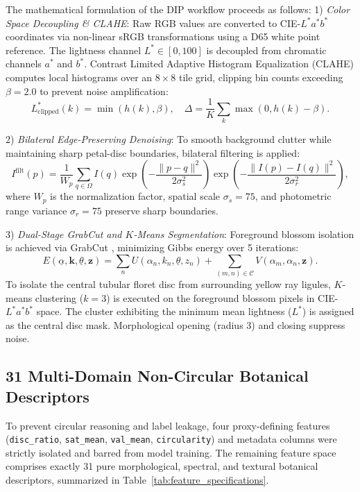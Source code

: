 \documentclass{ieeeaccess}
\begin{document}
The mathematical formulation of the DIP workflow proceeds as follows:
1) \textit{Color Space Decoupling \& CLAHE}: Raw RGB values are converted to CIE-$L^*a^*b^*$ coordinates via non-linear sRGB transformations using a D65 white point reference. The lightness channel $L^* \in [0, 100]$ is decoupled from chromatic channels $a^*$ and $b^*$. Contrast Limited Adaptive Histogram Equalization (CLAHE) \cite{zuiderveld1994contrast} computes local histograms over an $8 \times 8$ tile grid, clipping bin counts exceeding $\beta = 2.0$ to prevent noise amplification:
\begin{equation}
L^*_{\text{clipped}}(k) = \min(h(k), \beta), \quad \Delta = \frac{1}{K}\sum_k \max(0, h(k) - \beta).
\label{eq:clahe}
\end{equation}

2) \textit{Bilateral Edge-Preserving Denoising}: To smooth background clutter while maintaining sharp petal-disc boundaries, bilateral filtering \cite{tomasi1998bilateral} is applied:
\begin{equation}
I^{\text{filt}}(p) = \frac{1}{W_p} \sum_{q \in \Omega} I(q) \exp\left(-\frac{\|p - q\|^2}{2\sigma_s^2}\right) \exp\left(-\frac{\|I(p) - I(q)\|^2}{2\sigma_r^2}\right),
\label{eq:bilateral}
\end{equation}
where $W_p$ is the normalization factor, spatial scale $\sigma_s = 75$, and photometric range variance $\sigma_r = 75$ preserve sharp boundaries.

3) \textit{Dual-Stage GrabCut and $K$-Means Segmentation}: Foreground blossom isolation is achieved via GrabCut \cite{rother2004grabcut}, minimizing Gibbs energy over 5 iterations:
\begin{equation}
E(\underline{\alpha}, \mathbf{k}, \underline{\theta}, \mathbf{z}) = \sum_n U(\alpha_n, k_n, \underline{\theta}, z_n) + \sum_{(m,n) \in \mathcal{C}} V(\alpha_m, \alpha_n, \mathbf{z}).
\label{eq:grabcut}
\end{equation}
To isolate the central tubular floret disc from surrounding yellow ray ligules, $K$-means clustering ($k = 3$) is executed on the foreground blossom pixels in CIE-$L^*a^*b^*$ space. The cluster exhibiting the minimum mean lightness ($L^*$) is assigned as the central disc mask. Morphological opening (radius 3) and closing suppress noise.

\subsection{31 Multi-Domain Non-Circular Botanical Descriptors}
To prevent circular reasoning and label leakage, four proxy-defining features (\texttt{disc\_ratio}, \texttt{sat\_mean}, \texttt{val\_mean}, \texttt{circularity}) and metadata columns were strictly isolated and barred from model training. The remaining feature space comprises exactly 31 pure morphological, spectral, and textural botanical descriptors, summarized in Table~\ref{tab:feature_specifications}.
\end{document}
